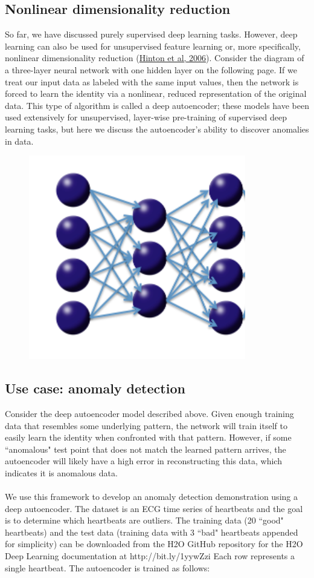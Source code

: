 \subsection{Nonlinear dimensionality reduction} 
So far, we have discussed purely supervised deep learning tasks. However, deep learning can also be used for unsupervised feature learning or, more specifically, nonlinear dimensionality reduction  (\href{http://www.cs.toronto.edu/~hinton/science.pdf}{Hinton et al, 2006}). Consider the diagram of a three-layer neural network with one hidden layer on the following page. If we treat our input data as labeled with the same input values, then the network is forced to learn the identity via a nonlinear, reduced representation of the original data. This type of algorithm is called a deep autoencoder; these models have been used extensively for unsupervised, layer-wise pre-training of supervised deep learning tasks, but here we discuss the autoencoder's ability to discover anomalies in data. 
\\
\begin{figure}[h!]
\centering
\includegraphics[scale=0.7]{autoencoder.png}
\end{figure}
\subsection{Use case: anomaly detection} %
Consider the deep autoencoder model described above. Given enough training data that resembles some underlying pattern, the network will train itself to easily learn the identity when confronted with that pattern. However, if some ``anomalous" test point that does not match the learned pattern arrives, the autoencoder will likely have a high error in reconstructing this data, which indicates it is anomalous data.
\\
\\
We use this framework to develop an anomaly detection demonstration using a deep autoencoder. The dataset is an ECG time series of heartbeats and the goal is to determine which heartbeats are outliers. The training data (20 ``good" heartbeats) and the test data (training data with 3 ``bad" heartbeats appended for simplicity) can be downloaded from the H2O GitHub repository for the H2O Deep Learning documentation at http://bit.ly/1yywZzi%
Each row represents a single heartbeat. The autoencoder is trained as follows: 

